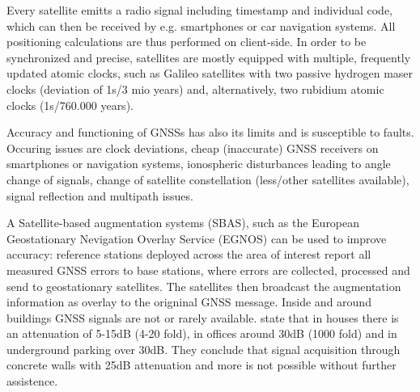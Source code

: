 Every satellite emitts a radio signal including timestamp and individual code, which can then be received by e.g. smartphones or car navigation systems. All positioning calculations are thus performed on client-side.
In order to be synchronized and precise, satellites are mostly equipped with multiple, frequently updated atomic clocks, such as Galileo satellites with two passive hydrogen maser clocks (deviation of 1s/3 mio years) and, alternatively, two rubidium atomic clocks (1s/760.000 years). 



Accuracy and functioning of GNSSs has also its limits and is susceptible to faults. Occuring issues are clock deviations, cheap (inaccurate) GNSS receivers on smartphones or navigation systems, ionospheric disturbances leading to angle change of signals, change of satellite constellation (less/other satellites available), signal reflection and multipath issues.

A Satellite-based augmentation systems (SBAS), such as the European Geostationary Nevigation Overlay Service (EGNOS) can be used to improve accuracy: reference stations deployed across the area of interest report all measured GNSS errors to base stations, where errors are collected, processed and send to geostationary satellites. The satellites then broadcast the augmentation information as overlay to the origninal GNSS message. \cite{egnos}
Inside and around buildings GNSS signals are not or rarely available.
\cite{gpsIndoorsMoeglich} state that in houses there is an attenuation of 5-15dB (4-20 fold), in offices around 30dB (1000 fold) and in underground parking over 30dB.
They conclude that signal acquisition through concrete walls with 25dB attenuation and more is not possible without further assistence.


